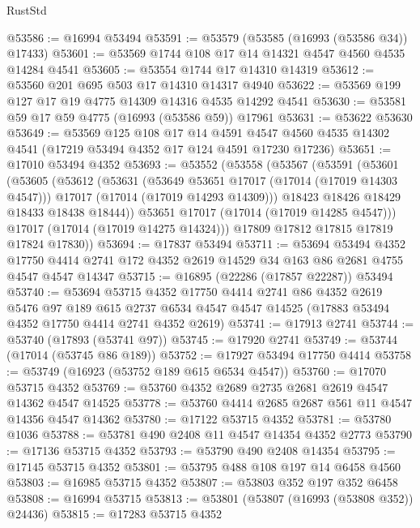 \begin{lexlean}{RustStd}
\begin{coremodule}
{\begin{coremodule}
{{{{{{{{{{{{{{{{{{{{{{{{{{{{{{{{{{{{{{{{{{{{{{{{{{{{{{{@53586 := @16994 @53494
@53591 := @53579 (@53585 (@16993 (@53586 @34)) @17433)
@53601 := @53569 @1744 @108 @17 @14 @14321 @4547 @4560 @4535 @14284 @4541
@53605 := @53554 @1744 @17 @14310 @14319
@53612 := @53560 @201 @695 @503 @17 @14310 @14317 @4940
@53622 := @53569 @199 @127 @17 @19 @4775 @14309 @14316 @4535 @14292 @4541
@53630 := @53581 @59 @17 @59 @4775 (@16993 (@53586 @59)) @17961
@53631 := @53622 @53630
@53649 := @53569
    @125
    @108
    @17
    @14
    @4591
    @4547
    @4560
    @4535
    @14302
    @4541
    (@17219 @53494 @4352 @17 @124 @4591 @17230 @17236)
@53651 := @17010 @53494 @4352
@53693 := @53552
    (@53558
      (@53567
        (@53591
          (@53601
            (@53605
              (@53612
                (@53631
                  (@53649 @53651 @17017 (@17014 (@17019 @14303 @4547)))
                  @17017
                  (@17014 (@17019 @14293 @14309)))
                @18423
                @18426
                @18429
                @18433
                @18438
                @18444))
            @53651
            @17017
            (@17014 (@17019 @14285 @4547)))
          @17017
          (@17014 (@17019 @14275 @14324)))
        @17809
        @17812
        @17815
        @17819
        @17824
        @17830))
@53694 := @17837 @53494
@53711 := @53694
    @53494
    @4352
    @17750
    @4414
    @2741
    @172
    @4352
    @2619
    @14529
    @34
    @163
    @86
    @2681
    @4755
    @4547
    @4547
    @14347
@53715 := @16895 (@22286 (@17857 @22287)) @53494
@53740 := @53694
    @53715
    @4352
    @17750
    @4414
    @2741
    @86
    @4352
    @2619
    @5476
    @97
    @189
    @615
    @2737
    @6534
    @4547
    @4547
    @14525
    (@17883 @53494 @4352 @17750 @4414 @2741 @4352 @2619)
@53741 := @17913 @2741
@53744 := @53740 (@17893 (@53741 @97))
@53745 := @17920 @2741
@53749 := @53744 (@17014 (@53745 @86 @189))
@53752 := @17927 @53494 @17750 @4414
@53758 := @53749 (@16923 (@53752 @189 @615 @6534 @4547))
@53760 := @17070 @53715 @4352
@53769 := @53760 @4352 @2689 @2735 @2681 @2619 @4547 @14362 @4547 @14525
@53778 := @53760 @4414 @2685 @2687 @561 @11 @4547 @14356 @4547 @14362
@53780 := @17122 @53715 @4352
@53781 := @53780 @1036
@53788 := @53781 @490 @2408 @11 @4547 @14354 @4352 @2773
@53790 := @17136 @53715 @4352
@53793 := @53790 @490 @2408 @14354
@53795 := @17145 @53715 @4352
@53801 := @53795 @488 @108 @197 @14 @6458 @4560
@53803 := @16985 @53715 @4352
@53807 := @53803 @352 @197 @352 @6458
@53808 := @16994 @53715
@53813 := @53801 (@53807 (@16993 (@53808 @352)) @24436)
@53815 := @17283 @53715 @4352
}}}}}}}}}}}}}}}}}}}}}}}}}}}}}}}}}}}}}}}}}}}}}}}}}}}}}}}
\end{coremodule}}
\end{coremodule}
\end{lexlean}
